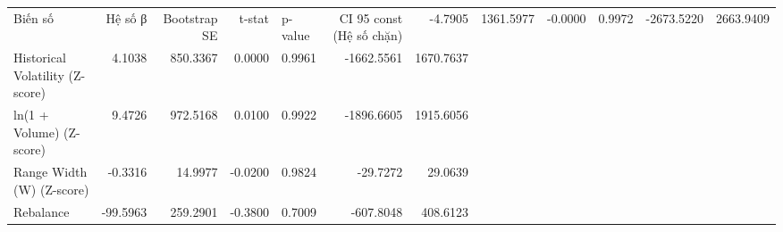 \begin{tabular}{lrrrlrr}
\toprule
Biến số & Hệ số β & Bootstrap SE & t-stat & p-value & CI 95%
\midrule
const (Hệ số chặn) & -4.7905 & 1361.5977 & -0.0000 & 0.9972 & -2673.5220 & 2663.9409 \\
Historical Volatility (Z-score) & 4.1038 & 850.3367 & 0.0000 & 0.9961 & -1662.5561 & 1670.7637 \\
ln(1 + Volume) (Z-score) & 9.4726 & 972.5168 & 0.0100 & 0.9922 & -1896.6605 & 1915.6056 \\
Range Width (W) (Z-score) & -0.3316 & 14.9977 & -0.0200 & 0.9824 & -29.7272 & 29.0639 \\
Rebalance & -99.5963 & 259.2901 & -0.3800 & 0.7009 & -607.8048 & 408.6123 \\
\bottomrule
\end{tabular}
